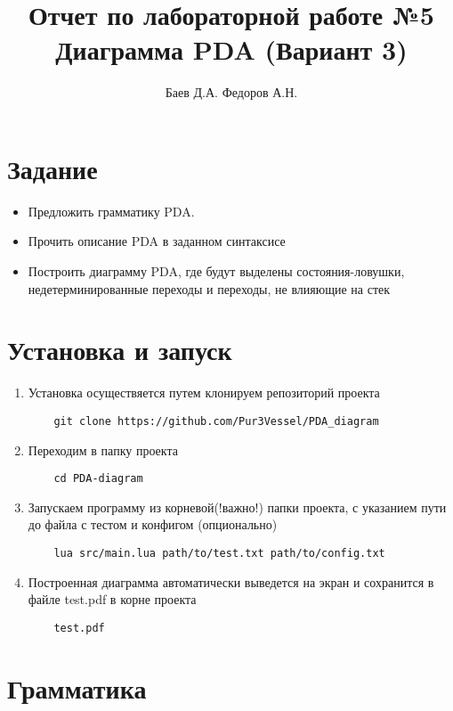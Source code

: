 \documentclass{article}
\title{Отчет по лабораторной работе №5 \\Диаграмма PDA (Вариант 3)}
\author{Баев Д.А. Федоров А.Н.}
\begin{document}
\maketitle


\section{Задание}
\begin{itemize}
  \item Предложить грамматику PDA.
  \item Прочить описание PDA в заданном синтаксисе
  \item Построить диаграмму PDA, где будут выделены состояния-ловушки, недетерминированные переходы и переходы, не влияющие на стек
\end{itemize}


\section{Установка и запуск}

\begin{enumerate}
    \item Установка осуществяется путем клонируем репозиторий проекта
    \begin{lstlisting}
    git clone https://github.com/Pur3Vessel/PDA_diagram
    \end{lstlisting}
    \item Переходим в папку проекта
    \begin{lstlisting}
    cd PDA-diagram
    \end{lstlisting}
    \item Запускаем программу из корневой(!важно!) папки проекта, с указанием пути до файла с тестом и конфигом (опционально)
    \begin{lstlisting}
    lua src/main.lua path/to/test.txt path/to/config.txt
    \end{lstlisting}
    \item Построенная диаграмма автоматически выведется на экран и сохранится в файле test.pdf в корне проекта
    \begin{lstlisting}
    test.pdf
    \end{lstlisting}
\end{enumerate}

\section{Грамматика}
\end{document}
